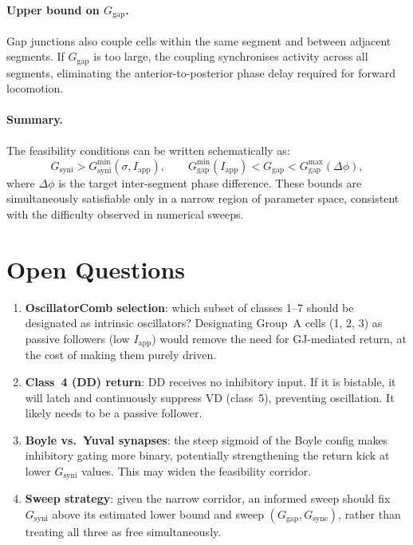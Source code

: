\documentclass[11pt]{article}
\begin{document}
\paragraph{Upper bound on $G_{\mathrm{gap}}$.}
Gap junctions also couple cells within the same segment and between adjacent segments.  If
$G_{\mathrm{gap}}$ is too large, the coupling synchronises activity across all segments,
eliminating the anterior-to-posterior phase delay required for forward locomotion.

\paragraph{Summary.}
The feasibility conditions can be written schematically as:
\begin{equation}
    G_{\mathrm{syni}} > G_{\mathrm{syni}}^{\min}(\sigma, I_{\mathrm{app}}),
    \qquad
    G_{\mathrm{gap}}^{\min}(I_{\mathrm{app}}) < G_{\mathrm{gap}} < G_{\mathrm{gap}}^{\max}(\Delta\phi),
\end{equation}
where $\Delta\phi$ is the target inter-segment phase difference.  These bounds are simultaneously
satisfiable only in a narrow region of parameter space, consistent with the difficulty observed in
numerical sweeps.

\section{Open Questions}

\begin{enumerate}
    \item \textbf{OscillatorComb selection}: which subset of classes 1--7 should be designated as
          intrinsic oscillators?  Designating Group~A cells (1, 2, 3) as passive followers (low
          $I_{\mathrm{app}}$) would remove the need for GJ-mediated return, at the cost of making
          them purely driven.
    \item \textbf{Class~4 (DD) return}: DD receives no inhibitory input.  If it is bistable, it
          will latch and continuously suppress VD (class~5), preventing oscillation.  It likely
          needs to be a passive follower.
    \item \textbf{Boyle vs.\ Yuval synapses}: the steep sigmoid of the Boyle config makes
          inhibitory gating more binary, potentially strengthening the return kick at lower
          $G_{\mathrm{syni}}$ values.  This may widen the feasibility corridor.
    \item \textbf{Sweep strategy}: given the narrow corridor, an informed sweep should fix
          $G_{\mathrm{syni}}$ above its estimated lower bound and sweep $(G_{\mathrm{gap}},
          G_{\mathrm{syne}})$, rather than treating all three as free simultaneously.
\end{enumerate}
\end{document}
